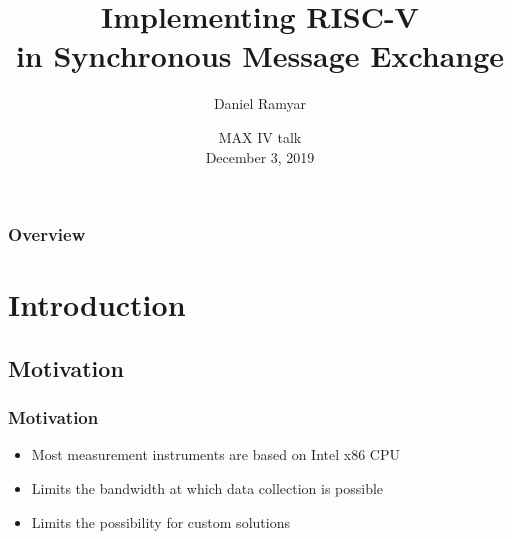 \documentclass{beamer}
\title{Implementing RISC-V\\ in Synchronous Message Exchange}
\author{Daniel Ramyar}
\institute{Niels Bohr Institute \\ University of Copenhagen}
\date{MAX IV talk \\ December 3, 2019}
\begin{document}
	\begin{frame}
		\titlepage
		\vspace{-0.5cm}	
	\end{frame}

	\begin{frame}
		\frametitle{Overview}

		\small{\tableofcontents}%
	\end{frame}
	
	\section{Introduction}

	\begin{frame}
		\subsection{Motivation}
		\frametitle{Motivation}
        \begin{itemize}
            \item Most measurement instruments are based on Intel x86 CPU
            \item Limits the bandwidth at which data collection is possible
            \item Limits the possibility for custom solutions 
        \end{itemize}

	\end{frame}
\end{document}
